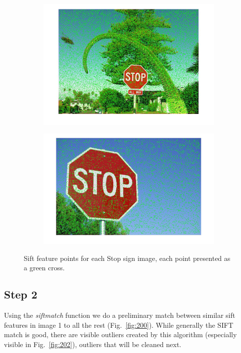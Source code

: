 \documentclass[a4paper]{iacas}
\begin{document}
\begin{figure}[!htbp]
	\begin{subfigure}[b]{0.23\textwidth}
		\includegraphics[width=\textwidth]{103.jpg}
		\caption{}
		\label{fig:103}
	\end{subfigure}
	\begin{subfigure}[b]{0.23\textwidth}
		\includegraphics[width=\textwidth]{104.jpg}
		\caption{}
		\label{fig:104}
	\end{subfigure}
	
	\caption{Sift feature points for each Stop sign image, each point presented as a green cross.}
	\label{fig:100}
\end{figure}

\subsection{Step 2}

Using the \textit{siftmatch} function we do a preliminary match between similar sift features in image 1 to all the rest (Fig.~\ref{fig:200}). While generally the SIFT match is good, there are visible outliers created by this algorithm (especially visible in Fig.~\ref{fig:202}), outliers that will be cleaned next.
\end{document}
